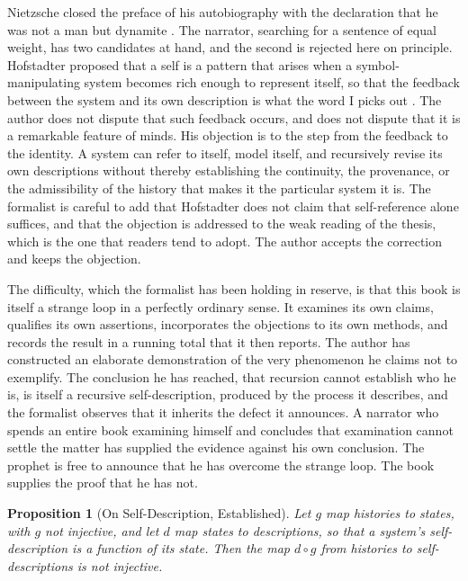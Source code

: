 \documentclass[11pt,openany,twoside]{book}
\theoremstyle{plain}
\newtheorem{proposition}{Proposition}[chapter]
\theoremstyle{definition}
\theoremstyle{remark}
\begin{document}
Nietzsche closed the preface of his autobiography with the declaration that he was not a man but dynamite \cite{nietzsche-ecce}. The narrator, searching for a sentence of equal weight, has two candidates at hand, and the second is rejected here on principle. Hofstadter proposed that a self is a pattern that arises when a symbol-manipulating system becomes rich enough to represent itself, so that the feedback between the system and its own description is what the word I picks out \cite{hofstadter-strange}. The author does not dispute that such feedback occurs, and does not dispute that it is a remarkable feature of minds. His objection is to the step from the feedback to the identity. A system can refer to itself, model itself, and recursively revise its own descriptions without thereby establishing the continuity, the provenance, or the admissibility of the history that makes it the particular system it is. The formalist is careful to add that Hofstadter does not claim that self-reference alone suffices, and that the objection is addressed to the weak reading of the thesis, which is the one that readers tend to adopt. The author accepts the correction and keeps the objection.

The difficulty, which the formalist has been holding in reserve, is that this book is itself a strange loop in a perfectly ordinary sense. It examines its own claims, qualifies its own assertions, incorporates the objections to its own methods, and records the result in a running total that it then reports. The author has constructed an elaborate demonstration of the very phenomenon he claims not to exemplify. The conclusion he has reached, that recursion cannot establish who he is, is itself a recursive self-description, produced by the process it describes, and the formalist observes that it inherits the defect it announces. A narrator who spends an entire book examining himself and concludes that examination cannot settle the matter has supplied the evidence against his own conclusion. The prophet is free to announce that he has overcome the strange loop. The book supplies the proof that he has not.

\begin{proposition}[On Self-Description, Established]\label{prop:selfdesc}
Let $g$ map histories to states, with $g$ not injective, and let $d$ map states to descriptions, so that a system's self-description is a function of its state. Then the map $d\circ g$ from histories to self-descriptions is not injective.
\end{proposition}
\end{document}
